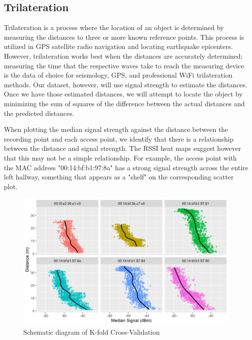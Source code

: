 \documentclass[12pt, conference]{IEEEtran}
\begin{document}
\subsection{Trilateration}
Trilateration is a process where the location of an object is determined by measuring the distances to three or more known reference points. This process is utilized in GPS satellite radio navigation and locating earthquake epicenters. However, trilateration works best when the distances are accurately determined; measuring the time that the respective waves take to reach the measuring device is the data of choice for seismology, GPS, and professional WiFi trilateration methods. Our dataset, however, will use signal strength to estimate the distances. Once we have those estimated distances, we will attempt to locate the object by minimizing the sum of squares of the difference between the actual distances and the predicted distances.

When plotting the median signal strength against the distance between the recording point and each access point, we identify that there is a relationship between the distance and signal strength. The RSSI heat maps suggest however that this may not be a simple relationship. For example, the access point with the MAC address "00:14:bf:b1:97:8a" has a strong signal strength across the entire left hallway, something that appears as a "shelf" on the corresponding scatter plot.

\begin{figure}[htbp]
  \centerline{\includegraphics[width=\columnwidth]{img/distance_against_median_signal.png}}
  \caption{Schematic diagram of K-fold Cross-Validation}
  \label{fig: K-Fold CV}
\end{figure}
\end{document}
